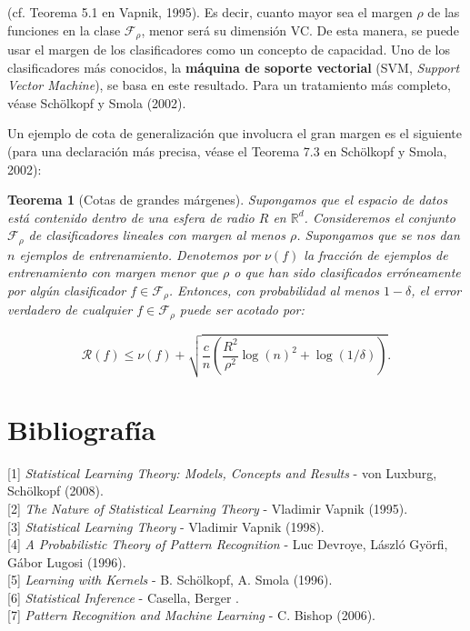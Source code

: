 \documentclass{article}
\newtheorem{thm}{Teorema}[subsection]
\begin{document}
(cf. Teorema 5.1 en Vapnik, 1995). Es decir, cuanto mayor sea el margen \(\rho\) de las funciones 
en la clase \(\mathcal{F}_\rho\), menor será su dimensión VC. De esta manera, se puede usar el 
margen de los clasificadores como un concepto de capacidad. Uno de los clasificadores más conocidos, 
la \textbf{máquina de soporte vectorial} (SVM, \textit{Support Vector Machine}), se basa en este 
resultado. Para un tratamiento más completo, véase Schölkopf y Smola (2002).

Un ejemplo de cota de generalización que involucra el gran margen es el siguiente (para una 
declaración más precisa, véase el Teorema 7.3 en Schölkopf y Smola, 2002):

\begin{thm}[Cotas de grandes márgenes]

Supongamos que el espacio de datos está contenido dentro de una esfera de radio \(R\) en 
\(\mathbb{R}^d\). Consideremos el conjunto \(\mathcal{F}_\rho\) de clasificadores lineales con 
margen al menos \(\rho\). Supongamos que se nos dan \(n\) ejemplos de entrenamiento. Denotemos 
por \(\nu(f)\) la fracción de ejemplos de entrenamiento con margen menor que \(\rho\) o que han 
sido clasificados erróneamente por algún clasificador \(f \in \mathcal{F}_\rho\). Entonces, con 
probabilidad al menos \(1 - \delta\), el error verdadero de cualquier \(f \in \mathcal{F}_\rho\) 
puede ser acotado por:

\[
\mathcal{R}(f) \leq \nu(f) + \sqrt{\frac{c}{n} \left( \frac{R^2}{\rho^2} \log(n)^2 + \log(1/\delta) \right)} .
\]
\end{thm}


\bigbreak
\pagebreak
\section{Bibliografía}

[1] \textit{Statistical Learning Theory: Models, Concepts and Results} - von Luxburg, Schölkopf (2008). \\

[2] \textit{The Nature of Statistical Learning Theory} - Vladimir Vapnik (1995). \\

[3] \textit{Statistical Learning Theory} - Vladimir Vapnik (1998). \\

[4] \textit{A Probabilistic Theory of Pattern Recognition} - Luc Devroye, László Györfi, Gábor Lugosi (1996). \\

[5] \textit{Learning with Kernels} - B. Schölkopf, A. Smola (1996). \\

[6] \textit{Statistical Inference} - Casella, Berger . \\

[7] \textit{Pattern Recognition and Machine Learning} - C. Bishop (2006). \\
\end{document}
